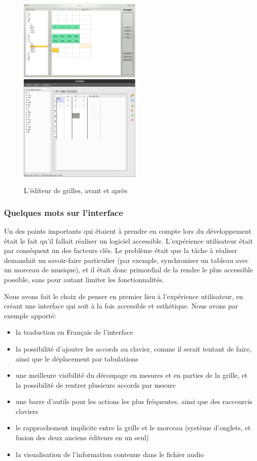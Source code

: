 \begin{figure}[H]
\begin{center}
\includegraphics[width=225px]{ancien_editeur.png}
\includegraphics[width=225px]{nouveau_editeur.png}
\caption{L'éditeur de grilles, avant et après}
\label{av_ap_editeur}
\end{center}
\end{figure}


\subsubsection*{Quelques mots sur l'interface}

Un des points importants qui étaient à prendre en compte lors du développement était le fait qu'il fallait réaliser un logiciel accessible. L'expérience utilisateur était par conséquent un des facteurs clés. Le problème était que la tâche à réaliser demandait un savoir-faire particulier (par exemple, synchroniser un tableau avec un morceau de musique), et il était donc primordial de la rendre le plus accessible possible, sans pour autant limiter les fonctionnalités.

Nous avons fait le choix de penser en premier lieu à l'expérience utilisateur, en créant une interface qui soit à la fois accessible et esthétique. Nous avons par exemple apporté:
\begin{itemize}
 \item la traduction en Français de l'interface
 \item la possibilité d'ajouter les accords au clavier, comme il serait tentant de faire, ainsi que le déplacement par tabulations
 \item une meilleure visibilité du découpage en mesures et en parties de la grille, et la possibilité de rentrer plusieurs accords par mesure
 \item une barre d'outils pour les actions les plus fréquentes, ainsi que des raccourcis claviers
 \item le rapprochement implicite entre la grille et le morceau (système d'onglets, et fusion des deux anciens éditeurs en un seul)
 \item la visualisation de l'information contenue dans le fichier audio
\end{itemize}

